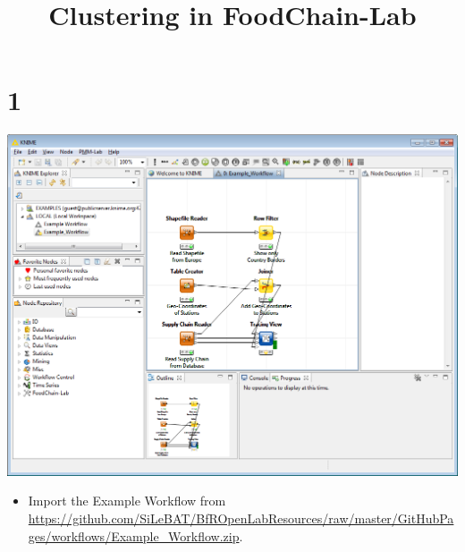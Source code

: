 \documentclass{beamer}
\title{Clustering in FoodChain-Lab}
\date{}
\begin{document}
\maketitle
 
\section{1}
\begin{frame}
	\begin{center}
  		\includegraphics[height=0.6\textheight]{1.png}
	\end{center}
	\begin{itemize}
		\item Import the Example Workflow from \url{https://github.com/SiLeBAT/BfROpenLabResources/raw/master/GitHubPages/workflows/Example_Workflow.zip}.
	\end{itemize}
\end{frame}
\end{document}
